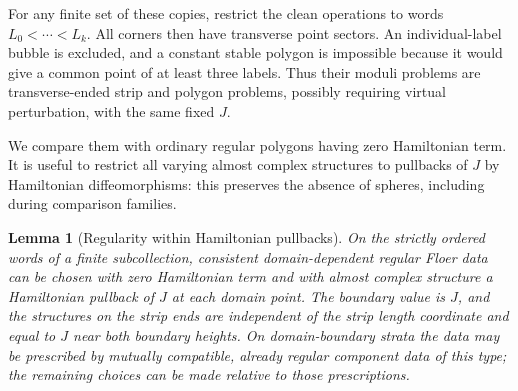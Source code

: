 \documentclass[11pt]{article}
\numberwithin{equation}{section}
\newtheorem{lemma}[theorem]{Lemma}
\theoremstyle{definition}
\theoremstyle{remark}
\begin{document}
For any finite set of these copies, restrict the clean operations to words
$L_0<\cdots<L_k$.  All corners then have transverse point sectors.
An individual-label bubble is excluded, and a constant stable polygon
is impossible because it would give a common point of at least three
labels.  Thus their moduli problems are transverse-ended strip and
polygon problems, possibly requiring virtual perturbation, with the
same fixed $J$.

We compare them with ordinary regular polygons having zero Hamiltonian
term.  It is useful to restrict all varying almost complex structures
to pullbacks of $J$ by Hamiltonian diffeomorphisms: this preserves
the absence of spheres, including during comparison families.

\begin{lemma}[Regularity within Hamiltonian pullbacks]
\label{lem:hamiltonian-pullback-regularity}
On the strictly ordered words of a finite subcollection, consistent
domain-dependent regular Floer data can be chosen with zero
Hamiltonian term and with almost complex structure a Hamiltonian
pullback of $J$ at each domain point.  The boundary value is $J$,
and the structures on the strip ends are independent of the strip
length coordinate and equal to $J$ near both boundary heights.
On domain-boundary strata the data may be prescribed by mutually
compatible, already regular component data of this type; the
remaining choices can be made relative to those prescriptions.
\end{lemma}
\end{document}
